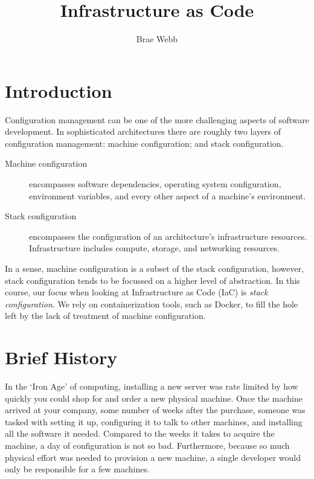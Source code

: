 \title{Infrastructure as Code}
\author{Brae Webb}
\date{}

\maketitle

\section{Introduction}
Configuration management can be one of the more challenging aspects of software development.
In sophisticated architectures there are roughly two layers of configuration management:
machine configuration; and stack configuration.

\begin{description}
    \item[Machine configuration] encompasses software dependencies, operating system configuration, environment variables,
    and every other aspect of a machine's environment.
    \item[Stack configuration] encompasses the configuration of an architecture's infrastructure resources.
    Infrastructure includes compute, storage, and networking resources.
\end{description}

In a sense, machine configuration is a subset of the stack configuration, however,
stack configuration tends to be focussed on a higher level of abstraction.
In this course, our focus when looking at Infrastructure as Code (IaC) is \textsl{stack configuration}.
We rely on containerization tools, such as Docker, to fill the hole left by the lack of treatment of machine configuration.

\section{Brief History}
In the `Iron Age' of computing, installing a new server was rate limited by how quickly you could shop for and order a new physical machine.
Once the machine arrived at your company,
some number of weeks after the purchase,
someone was tasked with setting it up,
configuring it to talk to other machines,
and installing all the software it needed.
Compared to the weeks it takes to acquire the machine,
a day of configuration is not so bad.
Furthermore, because so much physical effort was needed to provision a new machine,
a single developer would only be responsible for a few machines.


